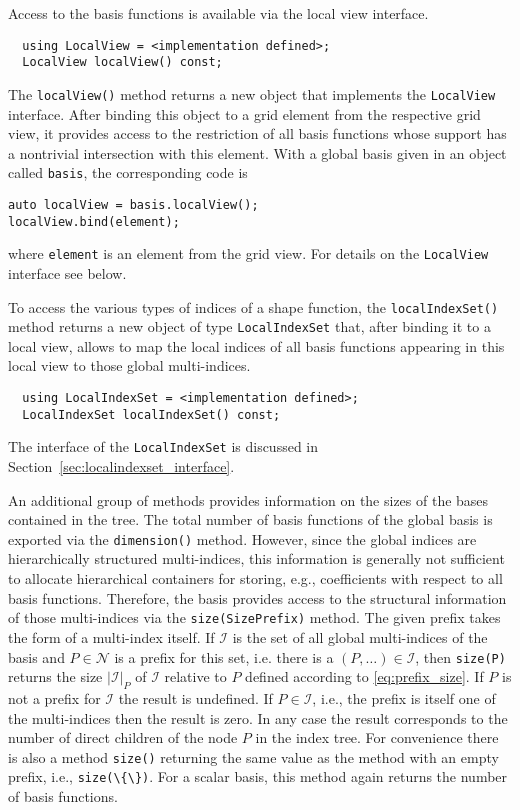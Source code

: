 \documentclass[a4paper,10pt,headings=normal,bibliography=totoc]{scrartcl}
\newcommand{\cpp}[1]{\lstinline[basicstyle=\ttfamily]!#1!}
\begin{document}
Access to the basis functions is available via the
local view interface.
\begin{lstlisting}
  using LocalView = <implementation defined>;
  LocalView localView() const;
\end{lstlisting}
The \cpp{localView()} method returns a new object that implements the \cpp{LocalView} interface.
After binding this object to a
grid element from the respective grid view, it provides access
to the restriction of all basis functions whose support has a
nontrivial intersection with this element.  With a global basis given in an object called \cpp{basis},
the corresponding code is
\begin{lstlisting}
auto localView = basis.localView();
localView.bind(element);
\end{lstlisting}
where \cpp{element} is an element from the grid view.
For details on the
\cpp{LocalView} interface see below.

To access the various types of indices of a shape function,
the \cpp{localIndexSet()} method
returns a new object of type \cpp{LocalIndexSet} that, after
binding it to a local view, allows to map the local indices
of all basis functions appearing in this local view to those
global multi-indices.
\begin{lstlisting}
  using LocalIndexSet = <implementation defined>;
  LocalIndexSet localIndexSet() const;
\end{lstlisting}
The interface of the \cpp{LocalIndexSet} is discussed in Section~\ref{sec:localindexset_interface}.

An additional group of methods provides information on the sizes of the bases
contained in the tree.
The total number of basis functions of the global basis is
exported via the \cpp{dimension()} method. However, since
the global indices are hierarchically structured multi-indices,
this information is generally not
sufficient to allocate hierarchical containers for storing,
e.g., coefficients with respect to all basis functions.
Therefore, the basis provides access to the structural
information of those multi-indices via the \cpp{size(SizePrefix)}
method. The given prefix takes the form of a multi-index itself.
If $\mathcal{I}$ is the set of all global multi-indices of the
basis and $P \in \mathcal{N}$ is a prefix for this set,
i.e. there is a $(P,\dots) \in \mathcal{I}$, then
\cpp{size(P)} returns the size $|\mathcal{I}|_P$ of
$\mathcal{I}$ relative to $P$ defined according to \eqref{eq:prefix_size}.
If $P$ is not a prefix for $\mathcal{I}$ the result is undefined.
If $P \in \mathcal{I}$, i.e., the prefix is itself one of the multi-indices
then the result is zero.
In any case the result corresponds to the number of direct children
of the node $P$ in the index tree.
For convenience there is also a method \cpp{size()} returning the same
value as the method with an empty prefix, i.e., \cpp{size(\{\})}.
For a scalar basis, this method again returns the number of basis functions.
\end{document}
